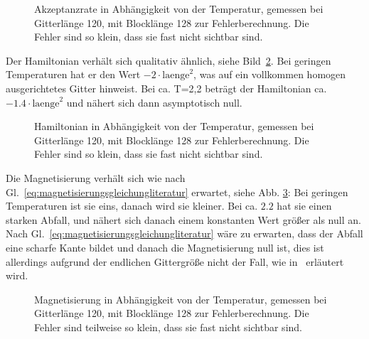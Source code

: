 	\begin{figure}[htbp]
		
		\caption[Akzeptanzrate in Abhängigkeit von der Temperatur]{Akzeptanzrate in Abhängigkeit von der Temperatur, gemessen bei Gitterlänge 120, mit Blocklänge 128 zur Fehlerberechnung. Die Fehler sind so klein, dass sie fast nicht sichtbar sind.}
		\label{fig:ergebnisakzeptanzrate}
	\end{figure}
	
	Der Hamiltonian verhält sich qualitativ ähnlich, siehe Bild~\ref{fig:ergebnishamiltonian}. Bei geringen Temperaturen hat er den Wert $-2\cdot\text{laenge}^2$, was auf ein vollkommen homogen ausgerichtetes Gitter hinweist. Bei ca.{} T=2,2 beträgt der Hamiltonian ca.{} $-\num{1,4}\cdot\text{laenge}^2$ und nähert sich dann asymptotisch null.
	
	
	
	
	\begin{figure}[htbp]
		
		\caption[Hamiltonian in Abhängigkeit von der Temperatur]{Hamiltonian in Abhängigkeit von der Temperatur, gemessen bei Gitterlänge 120, mit Blocklänge 128 zur Fehlerberechnung. Die Fehler sind so klein, dass sie fast nicht sichtbar sind.}
		\label{fig:ergebnishamiltonian}
	\end{figure}
	

	Die Magnetisierung verhält sich wie nach Gl.~\ref{eq:magnetisierungsgleichungliteratur} erwartet, siehe Abb. \ref{fig:ergebnismagnetisierung}: Bei geringen Temperaturen ist sie eins, danach wird sie kleiner. Bei ca. $\num{2,2}$ hat sie einen starken Abfall, und nähert sich danach einem konstanten Wert größer als null an. Nach Gl.~\ref{eq:magnetisierungsgleichungliteratur} wäre zu erwarten, dass der Abfall eine scharfe Kante bildet und danach die Magnetisierung null ist, dies ist allerdings aufgrund der endlichen Gittergröße nicht der Fall, wie in~\cite[S. 45 f.]{binderheermann} erläutert wird.
	


	
	\begin{figure}[htbp]
		
		\caption[Magnetisierung in Abhängigkeit von der Temperatur]{Magnetisierung in Abhängigkeit von der Temperatur, gemessen bei Gitterlänge 120, mit Blocklänge 128 zur Fehlerberechnung. Die Fehler sind teilweise so klein, dass sie fast nicht sichtbar sind.}
		\label{fig:ergebnismagnetisierung}
	\end{figure}
	
